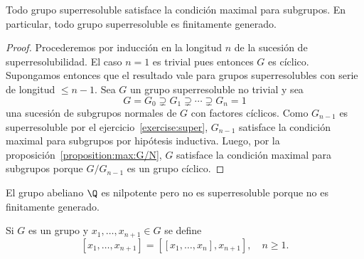 \begin{proposition}
	\label{proposition:superfg}
	Todo grupo superresoluble satisface la condición maximal para subgrupos. En
	particular, todo grupo superresoluble es finitamente generado.
\end{proposition}

\begin{proof}
	Procederemos por inducción en la longitud $n$ de la sucesión de
	superresolubilidad.  El caso $n=1$ es trivial pues entonces $G$ es cíclico.
	Supongamos entonces que el resultado vale para grupos superresolubles con
	serie de longitud $\leq n-1$.  Sea $G$ un grupo superresoluble no trivial y sea 
	\[
	G=G_0\supsetneq
	G_1\supsetneq\cdots\supsetneq G_n=1
	\]
	una sucesión de subgrupos normales de $G$ con factores cíclicos. Como
	$G_{n-1}$ es superresoluble por el ejercicio~\ref{exercise:super},
	$G_{n-1}$ satisface la condición maximal para subgrupos por hipótesis
	inductiva.  Luego, por la proposición~\ref{proposition:max:G/N}, $G$ satisface la condición maximal para subgrupos porque
	$G/G_{n-1}$ es un grupo cíclico.
\end{proof}

%

\begin{example}
	El grupo abeliano $\Q$ es nilpotente pero no es superresoluble
	porque no es finitamente generado.
\end{example}


Si $G$ es un grupo y $x_1,\dots,x_{n+1}\in G$ se define 
\[
[x_1,\dots,x_{n+1}]=\left[ [x_1,\dots,x_n],x_{n+1} \right],\quad
n\geq1.
\]

